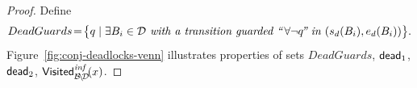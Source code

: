 \begin{proof}
%




Define
$$
DeadGuards\!=\!
\big\{ q \mid \exists B_i \in \mathcal{D}
         \textit{ with a transition guarded ``\,}
         {\forall \neg q} 
         \textit{\!'' in } (s_d(B_i),e_d(B_i)) \big\}.
$$
Figure~\ref{fig:conj-deadlocks-venn} illustrates properties of sets 
$DeadGuards$, ${\sf dead}_1$, ${\sf dead}_2$, $\mathsf{Visited}^{\textit{inf}}_{\mathcal{B}\!\setminus\!\mathcal{D}}\!(x)$.


\end{proof}
